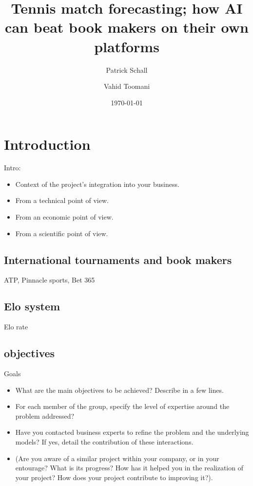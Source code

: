 \documentclass[preprint,aps,nofootinbib,a4paper,superscriptaddress,longbibliography,amsfonts,amssymb,amsmath,titlepage]{revtex4-2}
\begin{document}
\title{Tennis match forecasting; how AI can beat book makers on their own platforms}

\author{Patrick Schall}

\author{Vahid Toomani}

\date{\today}

\maketitle
\tableofcontents

\newpage

\section{Introduction}
Intro:
\begin{itemize}
\item Context of the project's integration into your business.
\item From a technical point of view.
\item From an economic point of view.
\item From a scientific point of view.
\end{itemize}

\subsection{International tournaments and book makers}
ATP, Pinnacle sports, Bet 365

\subsection{Elo system}
Elo rate

\subsection{objectives}
Goals
\begin{itemize}
\item What are the main objectives to be achieved? Describe in a few lines.
\item For each member of the group, specify the level of expertise around the problem addressed?
\item Have you contacted business experts to refine the problem and the underlying models? If yes, detail the contribution of these interactions.
\item (Are you aware of a similar project within your company, or in your entourage? What is its progress? How has it helped you in the realization of your project? How does your project contribute to improving it?).
\end{itemize}
\end{document}
